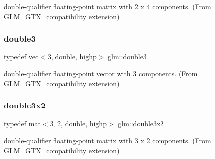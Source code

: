 double-\/qualifier floating-\/point matrix with 2 x 4 components. (From G\+L\+M\+\_\+\+G\+T\+X\+\_\+compatibility extension) 

\mbox{\label{group__gtx__compatibility_ga59c2d0879cea219643aec2f75b8beee9}} 
\subsubsection{\texorpdfstring{double3}{double3}}
{\footnotesize\ttfamily typedef \mbox{\hyperlink{structglm_1_1vec}{vec}}$<$3, double, \mbox{\hyperlink{namespaceglm_a36ed105b07c7746804d7fdc7cc90ff25ac6f7eab42eacbb10d59a58e95e362074}{highp}}$>$ \mbox{\hyperlink{group__gtx__compatibility_ga59c2d0879cea219643aec2f75b8beee9}{glm\+::double3}}}



double-\/qualifier floating-\/point vector with 3 components. (From G\+L\+M\+\_\+\+G\+T\+X\+\_\+compatibility extension) 

\mbox{\label{group__gtx__compatibility_ga92075f3b0988e062b5fcd25afb67e74c}} 
\subsubsection{\texorpdfstring{double3x2}{double3x2}}
{\footnotesize\ttfamily typedef \mbox{\hyperlink{structglm_1_1mat}{mat}}$<$3, 2, double, \mbox{\hyperlink{namespaceglm_a36ed105b07c7746804d7fdc7cc90ff25ac6f7eab42eacbb10d59a58e95e362074}{highp}}$>$ \mbox{\hyperlink{group__gtx__compatibility_ga92075f3b0988e062b5fcd25afb67e74c}{glm\+::double3x2}}}



double-\/qualifier floating-\/point matrix with 3 x 2 components. (From G\+L\+M\+\_\+\+G\+T\+X\+\_\+compatibility extension) 

\mbox{\label{group__gtx__compatibility_ga7cf33790969e0985a53ff01d914bf8ef}} 
